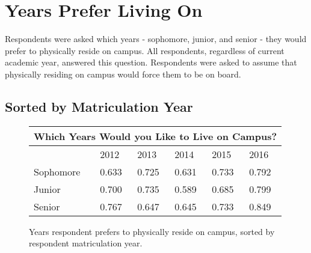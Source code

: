 \documentclass[12pt]{article} %
\begin{document}
\section{Years Prefer Living On}
Respondents were asked which years - sophomore, junior, and senior - they would prefer to physically reside on campus. All respondents, regardless of current academic year, answered this question. Respondents were asked to assume that physically residing on campus would force them to be on board.

\subsection{Sorted by Matriculation Year}
\begin{figure}[H]
	\vspace{-13mm}
	\begin{center}
\begin{tabular}{|m{2 cm}|m{1.3 cm}|m{1.3 cm}|m{1.3 cm}|m{1.3 cm}|m{1.3 cm} |}
\hline
\multicolumn{6}{|c|}{Which Years Would you Like to Live on Campus?}\\ \hline
& 2012& 2013& 2014& 2015& 2016\\ \hline
Sophomore   &  0.633 &  0.725 &  0.631 &  0.733 &  0.792\\ \hline
Junior   &  0.700 &  0.735 &  0.589 &  0.685 &  0.799\\ \hline
Senior   &  0.767 &  0.647 &  0.645 &  0.733 &  0.849\\ \hline
\end{tabular}
\end{center}
	\caption{Years respondent prefers to physically reside on campus, sorted by respondent matriculation year.}
\end{figure}
\end{document}
